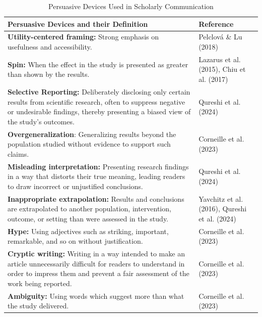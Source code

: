 \documentclass[authordate, meta]{jote-new-article}
\begin{document}
	\begin{table}
		\begin{fullwidth}
			
		\caption{Persuasive Devices Used in Scholarly Communication}
		\begin{tabularx}{\linewidth}{@{} X l @{}}
			\hline Persuasive Devices and their Definition & Reference \\

			\hline \textbf{Utility-centered framing: }Strong emphasis on usefulness and accessibility.
			& Pelclová \& Lu (2018) \\

			 \textbf{Spin:} When the effect in the study is presented as greater than shown by the results.
			& Lazarus et al. (2015), Chiu et al. (2017) \\

			 \textbf{Selective Reporting: }Deliberately disclosing only certain results from scientific research, often to suppress negative or undesirable findings, thereby presenting a biased view of the study's outcomes.
			& Qureshi et al. (2024) \\

			 \textbf{Overgeneralization}: Generalizing results beyond the population studied without evidence to support such claims.
			& Corneille et al. (2023) \\

			 \textbf{Misleading interpretation: }Presenting research findings in a way that distorts their true meaning, leading readers to draw incorrect or unjustified conclusions.
			& Qureshi et al. (2024) \\

			 \textbf{Inappropriate extrapolation:} Results and conclusions are extrapolated to another population, intervention, outcome, or setting than were assessed in the study.
			& Yavchitz et al. (2016), Qureshi et al. (2024) \\

			 \textbf{Hype:} Using adjectives such as striking, important, remarkable, and so on without justification.
			& Corneille et al. (2023) \\

			 \textbf{Cryptic writing:} Writing in a way intended to make an article unnecessarily difficult for readers to understand in order to impress them and prevent a fair assessment of the work being reported.
			& Corneille et al. (2023) \\

			 \textbf{Ambiguity:} Using words which suggest more than what the study delivered.
			& Corneille et al. (2023) \\


		\end{tabularx}
	\end{fullwidth}
	
	\end{table}
\end{document}
